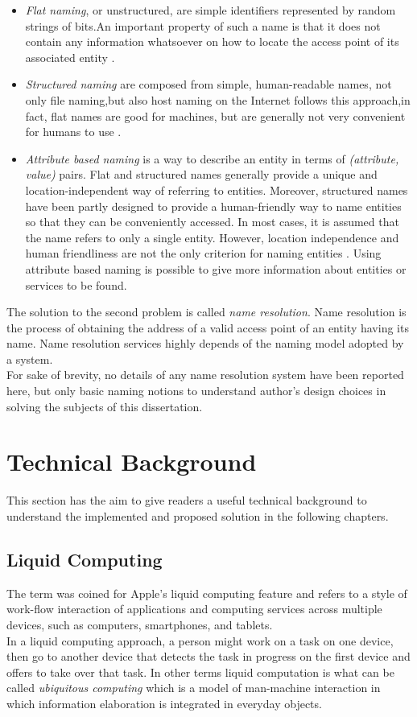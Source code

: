 \begin{itemize}
	\item \textit{Flat naming}, or unstructured, are simple identifiers represented by random strings of bits.An important property of such a name is that it does not contain any information whatsoever on how to locate the	access point of its associated entity \cite{tanenbaum2010distributed}.
	\item \textit{Structured naming} are composed from simple, human-readable names, not only file naming,but also host naming on the Internet follows this approach,in fact, flat names are good for machines, but are generally not very convenient for humans to use \cite{tanenbaum2010distributed}.
	\item \textit{Attribute based naming} is a way to describe an entity in terms of \textit{(attribute, value)}
	pairs. Flat and structured names generally provide a unique and location-independent
	way of referring to entities. Moreover, structured names have been partly
	designed to provide a human-friendly way to name entities so that they can be
	conveniently accessed. In most cases, it is assumed that the name refers to only a
	single entity. However, location independence and human friendliness are not the
	only criterion for naming entities \cite{tanenbaum2010distributed}. Using attribute based naming is possible to give more information about entities or services to be found.
\end{itemize}
The solution to the second problem is called \textit{name resolution}. Name resolution is the process of obtaining the address of a valid access point of an entity having its name. Name resolution services highly depends of the naming model adopted by a system.\\
For sake of brevity, no details of any name resolution system have been reported here, but only basic naming notions to understand author's design choices in solving the subjects of this dissertation. 


\section{Technical Background}\label{techback}
This section has the aim to give readers a useful technical background to understand the implemented and proposed solution in the following chapters.
\subsection{Liquid Computing}\label{liquid computing}
The term was coined for Apple's liquid computing feature and refers to a style of work-flow interaction of applications and computing services across multiple devices, such as computers, smartphones, and tablets.\\
In a liquid computing approach, a person might work on a task on one device, then go to another device that detects the task in progress on the first device and offers to take over that task.
In other terms liquid computation is what can be called \textit{ubiquitous computing} which is a model of man-machine interaction in which information elaboration is integrated in everyday objects.
